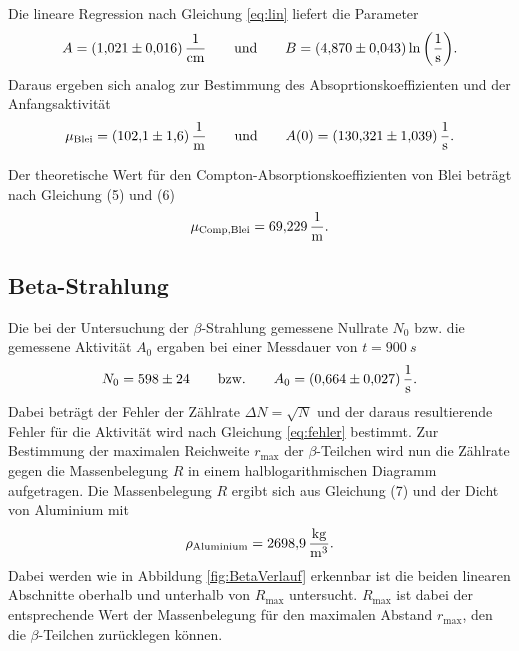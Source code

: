Die lineare Regression nach Gleichung \ref{eq:lin} liefert die Parameter
\begin{equation}
  A = \SI{1.021 \pm 0.016}{\frac{1}{cm}} \qquad \text{und} \qquad B = \SI{4.870 \pm 0.043}{\text{ln}\left (\frac{1}{s}\right)}. \notag
\end{equation}
Daraus ergeben sich analog zur Bestimmung des Absoprtionskoeffizienten und der Anfangsaktivität
\begin{equation}
  \mu_\text{Blei} = \SI{102.1 \pm 1.6}{\frac{1}{m}} \qquad \text{und} \qquad A(0) = \SI{130.321 \pm 1.039}{\frac{1}{s}}.  \notag 
\end{equation}

Der theoretische Wert für den Compton-Absorptionskoeffizienten von Blei beträgt nach Gleichung (5) und (6)
\begin{equation}
  \mu_\text{Comp,Blei} = \SI{69.229}{\frac{1}{m}}. \notag
\end{equation}

\subsection{Beta-Strahlung}
Die bei der Untersuchung der $\beta$-Strahlung gemessene Nullrate $N_0$ bzw. die gemessene Aktivität $A_0$ ergaben bei einer Messdauer von $t = \SI{900}{s}$
\begin{equation}
    N_0 = 598 \pm 24 \qquad \text{bzw.} \qquad A_0 = \SI{0.664 \pm 0.027}{\frac{1}{s}}. \notag
\end{equation}
Dabei beträgt der Fehler der Zählrate $\Delta N = \sqrt{N}$ und der daraus resultierende Fehler für die Aktivität wird nach Gleichung \ref{eq:fehler} bestimmt.
Zur Bestimmung der maximalen Reichweite $r_\text{max}$ der $\beta$-Teilchen wird nun die Zählrate gegen die Massenbelegung $R$ in einem halblogarithmischen Diagramm aufgetragen.
Die Massenbelegung $R$ ergibt sich aus Gleichung (7) und der Dicht von Aluminium mit
\begin{equation}
  \rho_\text{Aluminium} = \SI{2698.9}{\frac{kg}{m^3}}. \notag
\end{equation}
Dabei werden wie in Abbildung \ref{fig:BetaVerlauf} erkennbar ist die beiden linearen Abschnitte oberhalb und unterhalb von $R_\text{max}$ untersucht.
$R_\text{max}$ ist dabei der entsprechende Wert der Massenbelegung für den maximalen Abstand $r_\text{max}$, den die $\beta$-Teilchen zurücklegen können.

